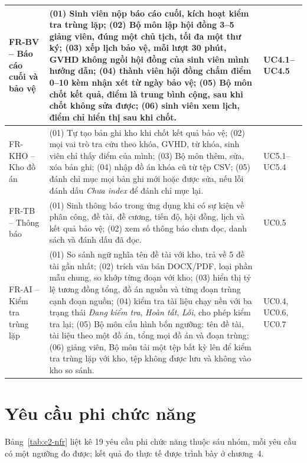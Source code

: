 \documentclass[../main.tex]{subfiles}
\begin{document}
{\begin{longtable}{|>{\raggedright\arraybackslash}p{2.4cm}|p{10.4cm}|>{\raggedright\arraybackslash}p{1.9cm}|}
\hline
FR-BV -- Báo cáo cuối và bảo vệ & (01) Sinh viên nộp báo cáo cuối, kích hoạt kiểm tra trùng lặp; (02) Bộ môn lập hội đồng 3--5 giảng viên, đúng một chủ tịch, tối đa một thư ký; (03) xếp lịch bảo vệ, mỗi lượt 30 phút, GVHD không ngồi hội đồng của sinh viên mình hướng dẫn; (04) thành viên hội đồng chấm điểm 0--10 kèm nhận xét từ ngày bảo vệ; (05) Bộ môn chốt kết quả, điểm là trung bình cộng, sau khi chốt không sửa được; (06) sinh viên xem lịch, điểm chỉ hiển thị sau khi chốt. & UC4.1--UC4.5 \\
\hline
FR-KHO -- Kho đồ án & (01) Tự tạo bản ghi kho khi chốt kết quả bảo vệ; (02) mọi vai trò tra cứu theo khóa, GVHD, từ khóa, sinh viên chỉ thấy điểm của mình; (03) Bộ môn thêm, sửa, xóa bản ghi; (04) nhập đồ án khóa cũ từ tệp CSV; (05) đánh chỉ mục mọi bản ghi mới hoặc được sửa, nếu lỗi đánh dấu \textit{Chưa index} để đánh chỉ mục lại. & UC5.1--UC5.4 \\
\hline
FR-TB -- Thông báo & (01) Sinh thông báo trong ứng dụng khi có sự kiện về phân công, đề tài, đề cương, tiến độ, hội đồng, lịch và kết quả bảo vệ; (02) xem số thông báo chưa đọc, danh sách và đánh dấu đã đọc. & UC0.5 \\
\hline
FR-AI -- Kiểm tra trùng lặp & (01) So sánh ngữ nghĩa tên đề tài với kho, trả về 5 đề tài gần nhất; (02) trích văn bản DOCX/PDF, loại phần mẫu chung, so khớp từng đoạn với kho; (03) hiển thị tỷ lệ tương đồng tổng, đồ án nguồn và từng đoạn trùng cạnh đoạn nguồn; (04) kiểm tra tài liệu chạy nền với ba trạng thái \textit{Đang kiểm tra}, \textit{Hoàn tất}, \textit{Lỗi}, cho phép kiểm tra lại; (05) Bộ môn cấu hình bốn ngưỡng: tên đề tài, tài liệu theo một đồ án, tổng mọi đồ án và đoạn trùng; (06) giảng viên, Bộ môn tải một tệp bất kỳ lên để kiểm tra trùng lặp với kho, tệp không được lưu và không vào kho so sánh. & UC0.4, UC0.6, UC0.7 \\
\hline
\end{longtable}
}

\section{Yêu cầu phi chức năng}\label{sec:c2-nfr}

Bảng~\ref{tab:c2-nfr} liệt kê 19 yêu cầu phi chức năng thuộc sáu nhóm, mỗi yêu cầu có một ngưỡng đo được; kết quả đo thực tế được trình bày ở chương~4.
\end{document}
